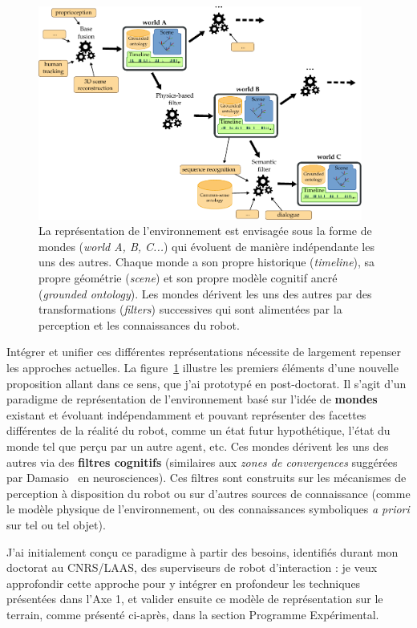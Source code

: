 \documentclass[a4paper]{article}
\begin{document}
\begin{figure}
    \centering
\includegraphics[width=0.95\textwidth]{figs/worlds}
\caption{\small La représentation de l'environnement est envisagée sous la forme
    de mondes (\emph{world A, B, C...}) qui évoluent de manière indépendante les
    uns des autres. Chaque monde a son propre historique (\emph{timeline}), sa
    propre géométrie (\emph{scene}) et son propre modèle cognitif ancré
    (\emph{grounded ontology}).  Les mondes dérivent les uns des autres par des
    transformations (\emph{filters}) successives qui sont alimentées par la
    perception et les connaissances du robot.  }

\label{worlds}
\end{figure}

Intégrer et unifier ces différentes représentations nécessite de largement
repenser les approches actuelles. La figure~\ref{worlds} illustre les premiers
éléments d'une nouvelle proposition allant dans ce sens, que j'ai prototypé en
post-doctorat. Il s'agit d'un paradigme de représentation de l'environnement
basé sur l'idée de \textbf{mondes} existant et évoluant indépendamment et
pouvant représenter des facettes différentes de la réalité du robot, comme un
état futur hypothétique, l'état du monde tel que perçu par un autre agent,
etc. Ces mondes dérivent les uns des autres via des \textbf{filtres cognitifs}
(similaires aux \emph{zones de convergences} suggérées par
Damasio~\cite{damasio1989time} en neurosciences). Ces filtres sont construits
sur les mécanismes de perception à disposition du robot ou sur d'autres sources de
connaissance (comme le modèle physique de l'environnement, ou des connaissances
symboliques \textit{a priori} sur tel ou tel objet).

J'ai initialement conçu ce paradigme à partir des besoins, identifiés durant
mon doctorat au CNRS/LAAS, des superviseurs de robot d'interaction : je veux
approfondir cette approche pour y intégrer en profondeur les techniques
présentées dans l'Axe 1, et valider ensuite ce modèle de représentation sur le
terrain, comme présenté ci-après, dans la section Programme Expérimental.
\end{document}
